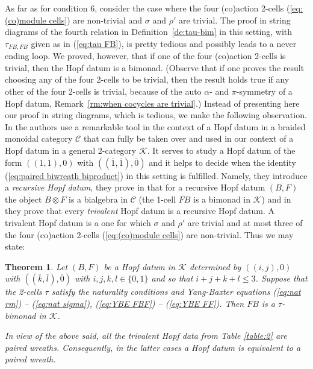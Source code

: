 \documentclass[a4paper, 12pt]{article}
\renewcommand{\_}[1]{\mbox{$_{\left( #1 \right)}$}}
\theoremstyle{plain}
\newtheorem{thm}{Theorem}[section]
\newcommand{\ot}{\otimes}
\newcommand{\C}{{\mathcal C}}
\newcommand{\crta}{\overline}
\def\K{{\mathcal K}}  %
\newcommand{\equref}[1]{(\ref{eq:#1})}
\newcommand{\thlabel}[1]{\label{th:#1}}
\newcommand{\deref}[1]{Definition~\ref{de:#1}}
\newcommand{\rmref}[1]{Remark~\ref{rm:#1}}
\begin{document}
As far as for condition 6, consider the case where the four (co)action 2-cells \equref{(co)module cells} are non-trivial and $\sigma$ and $\rho'$ are trivial. 
The proof in string diagrams of the fourth relation in \deref{tau-bim} in this setting, with 
$\tau_{FB,FB}$ given as in \equref{tau FB}, is pretty tedious and possibly leads to a never ending loop. We proved, however, that if one of the 
four (co)action 2-cells is trivial, then the Hopf datum is a bimonad. (Observe that if one proves the result choosing any of the four 2-cells to be trivial, then 
the result holds true if any other of the four 2-cells is trivial, because of the auto $\alpha$- and $\pi$-symmetry of a Hopf datum, \rmref{when cocycles are trivial}.) 
Instead of presenting here our proof in string diagrams, which is tedious, we make the following observation. 
In \cite[Section 2]{BD1} the authors use a remarkable tool in the context of a Hopf datum in a braided monoidal category $\C$ that can fully be taken over and used in our context of 
a Hopf datum in a general 2-category $\K$. It serves to study a Hopf datum of the form $((1,1),0)$ with $((\crta 1,\crta 1),\crta 0)$ and it helps to decide when the 
identity \equref{paired biwreath biproduct} in this setting is fulfilled. Namely, they introduce a {\em recursive Hopf datum}, they prove in \cite[Theorem 2.14]{BD1} 
that for a recursive Hopf datum $(B,F)$ the object $B\ot F$ is a bialgebra in $\C$ (the 1-cell $FB$ is a bimonad in $\K$) and in \cite[Definition and Proposition 2.15]{BD1} they prove that 
every {\em trivalent} Hopf datum is a recursive Hopf datum. A trivalent Hopf datum is a one for which $\sigma$ and $\rho'$ are trivial and at most three of the four (co)action 2-cells 
\equref{(co)module cells} are non-trivial. %
Thus we may state: 


\begin{thm} \thlabel{sufficient for bimonad}
Let $(B,F)$ be a Hopf datum in $\K$ determined by $((i,j),0)$ with $((\crta k,\crta l),\crta 0)$ with $i,j,k,l\in\{0,1\}$ and so that $i+j+k+l\leq 3$. 
Suppose that the 2-cells $\tau$ satisfy the naturality conditions and Yang-Baxter equations \equref{nat rm} -- \equref{nat sigma}, \equref{YBE FBF} -- \equref{YBE FF}. 
Then $FB$ is a $\tau$-bimonad in $\K$.   

In view of the above said, all the trivalent Hopf data from Table \ref{table:2} are paired wreaths. Consequently, in the latter cases a Hopf datum is equivalent to a paired wreath.
\end{thm}
\end{document}
